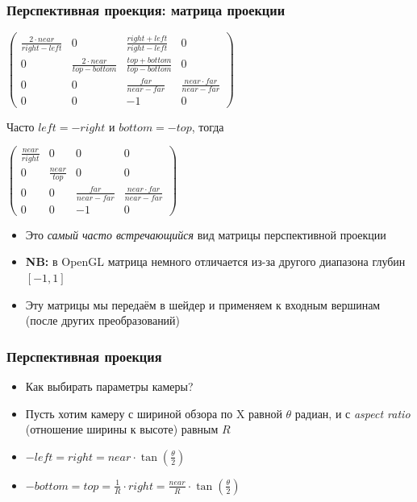 \documentclass[10pt]{beamer}
\begin{document}
\begin{frame}[fragile]
\frametitle{Перспективная проекция: матрица проекции}
\begin{center}
\begin{math}
\begin{pmatrix}
\frac{2\cdot near}{right - left} & 0 & \frac{right + left}{right - left} & 0 \\
0 & \frac{2\cdot near}{top - bottom} & \frac{top + bottom}{top - bottom} & 0 \\
0 & 0 & \frac{far}{near - far} & \frac{near \cdot far}{near - far} \\
0 & 0 & -1 & 0
\end{pmatrix}
\end{math}
\end{center}

\pause
Часто \(left=-right\) и \(bottom=-top\), тогда

\begin{center}
\begin{math}
\begin{pmatrix}
\frac{near}{right} & 0 & 0 & 0 \\
0 & \frac{near}{top} & 0 & 0 \\
0 & 0 & \frac{far}{near - far} & \frac{near \cdot far}{near - far} \\
0 & 0 & -1 & 0
\end{pmatrix}
\end{math}
\end{center}
\begin{itemize}
\item Это \textit{самый часто встречающийся} вид матрицы перспективной проекции
\pause
\item \textbf{NB:} в OpenGL матрица немного отличается из-за другого диапазона глубин \([-1, 1]\)
\pause
\item Эту матрицы мы передаём в шейдер и применяем к входным вершинам (после других преобразований)
\end{itemize}
\end{frame}

\begin{frame}[fragile]
\frametitle{Перспективная проекция}
\begin{itemize}
\item Как выбирать параметры камеры?
\pause
\item Пусть хотим камеру с шириной обзора по X равной \begin{math}\theta\end{math} радиан, и с \textit{aspect ratio} (отношение ширины к высоте) равным \begin{math}R\end{math}
\pause
\item \begin{math}-left=right=near \cdot \tan\left(\frac{\theta}{2}\right)\end{math}
\item \begin{math}-bottom=top=\frac{1}{R} \cdot right = \frac{near}{R} \cdot \tan\left(\frac{\theta}{2}\right)\end{math}
\end{itemize}
\end{frame}
\end{document}
